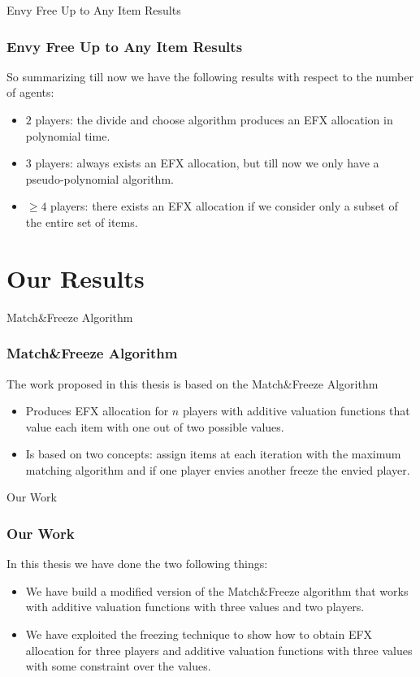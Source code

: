 \begin{frame}{Envy Free Up to Any Item Results}
\frametitle{Envy Free Up to Any Item Results}
So summarizing till now we have the following results with respect to the number of agents:
\begin{itemize}
    \item $2$ players: the divide and choose algorithm produces an EFX allocation in polynomial time\cite{DBLP:cut-and-choose-indivisible}.
    \item $3$ players: always exists an EFX allocation, but till now we only have a pseudo-polynomial algorithm\cite{DBLP:3p-efx-existance}.
    \item $\ge4$ players: there exists an EFX allocation if we consider only a subset of the entire set of items\cite{DBLP:efx-charity}.
\end{itemize}
\end{frame}

\section{Our Results}
\begin{frame}{Match\&Freeze Algorithm}
\frametitle{Match\&Freeze Algorithm}
The work proposed in this thesis is based on the Match\&Freeze Algorithm\cite{DBLP:MaximumNashWelfareandOtherStoriesAboutEFX}
\begin{itemize}
    \item Produces EFX allocation for $n$ players with additive valuation functions that value each item with one out of two possible values.
    \item Is based on two concepts: assign items at each iteration with the maximum matching algorithm and if one player envies another freeze the envied player.
\end{itemize}
\end{frame}

\begin{frame}{Our Work}
\frametitle{Our Work}
In this thesis we have done the two following things:
\begin{itemize}
    \item We have build a modified version of the Match\&Freeze algorithm that works with additive valuation functions with three values and two players.
    \item We have exploited the freezing technique to show how to obtain EFX allocation for three players and additive valuation functions with three values with some constraint over the values.
\end{itemize}
\end{frame}


